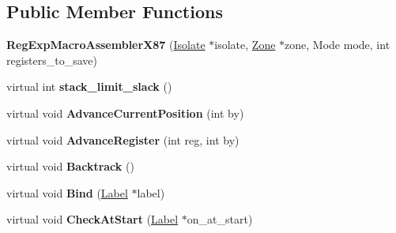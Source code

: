\subsection*{Public Member Functions}
\begin{DoxyCompactItemize}
\item 
{\bfseries Reg\+Exp\+Macro\+Assembler\+X87} (\hyperlink{classv8_1_1internal_1_1_isolate}{Isolate} $\ast$isolate, \hyperlink{classv8_1_1internal_1_1_zone}{Zone} $\ast$zone, Mode mode, int registers\+\_\+to\+\_\+save)\hypertarget{classv8_1_1internal_1_1_reg_exp_macro_assembler_x87_a54963a7f7cdfc53d7efb9e2a2e529eb8}{}\label{classv8_1_1internal_1_1_reg_exp_macro_assembler_x87_a54963a7f7cdfc53d7efb9e2a2e529eb8}

\item 
virtual int {\bfseries stack\+\_\+limit\+\_\+slack} ()\hypertarget{classv8_1_1internal_1_1_reg_exp_macro_assembler_x87_a49bae13f001b1a9309be804a8b8661f4}{}\label{classv8_1_1internal_1_1_reg_exp_macro_assembler_x87_a49bae13f001b1a9309be804a8b8661f4}

\item 
virtual void {\bfseries Advance\+Current\+Position} (int by)\hypertarget{classv8_1_1internal_1_1_reg_exp_macro_assembler_x87_a4eb6c17dc23b48a6ff74e16b0e7baa8f}{}\label{classv8_1_1internal_1_1_reg_exp_macro_assembler_x87_a4eb6c17dc23b48a6ff74e16b0e7baa8f}

\item 
virtual void {\bfseries Advance\+Register} (int reg, int by)\hypertarget{classv8_1_1internal_1_1_reg_exp_macro_assembler_x87_a143b447d6296c218db58130e500fb85d}{}\label{classv8_1_1internal_1_1_reg_exp_macro_assembler_x87_a143b447d6296c218db58130e500fb85d}

\item 
virtual void {\bfseries Backtrack} ()\hypertarget{classv8_1_1internal_1_1_reg_exp_macro_assembler_x87_a17877bcac82def4effdb9838e3fe9ae5}{}\label{classv8_1_1internal_1_1_reg_exp_macro_assembler_x87_a17877bcac82def4effdb9838e3fe9ae5}

\item 
virtual void {\bfseries Bind} (\hyperlink{classv8_1_1internal_1_1_label}{Label} $\ast$label)\hypertarget{classv8_1_1internal_1_1_reg_exp_macro_assembler_x87_acbcf7aa8ed01755b3c6d1a231234538e}{}\label{classv8_1_1internal_1_1_reg_exp_macro_assembler_x87_acbcf7aa8ed01755b3c6d1a231234538e}

\item 
virtual void {\bfseries Check\+At\+Start} (\hyperlink{classv8_1_1internal_1_1_label}{Label} $\ast$on\+\_\+at\+\_\+start)\hypertarget{classv8_1_1internal_1_1_reg_exp_macro_assembler_x87_ad18b8ae7ad4c08182dc1ae6ef081bfc5}{}\label{classv8_1_1internal_1_1_reg_exp_macro_assembler_x87_ad18b8ae7ad4c08182dc1ae6ef081bfc5}


\end{DoxyCompactItemize}
